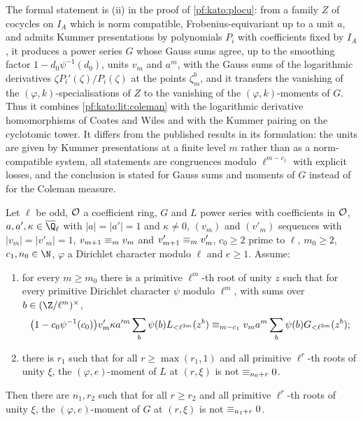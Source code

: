 \begin{remark}\label{pf:kato:rem:coleman}
The formal statement is (ii) in the proof of \cref{pf:kato:plocu}: from a family $Z$ of cocycles on $I_A$ which is norm compatible,
Frobenius-equivariant up to a unit $a$, and admits Kummer presentations by polynomials $P_i$ with coefficients fixed by $I_A$, it
produces a power series $G$ whose Gauss sums agree, up to the smoothing factor $1-d_0\psi^{-1}(d_0)$, units $v_m$ and $a^m$, with the
Gauss sums of the logarithmic derivatives $\zeta P_i'(\zeta)/P_i(\zeta)$ at the points $\zeta_m^b$, and it transfers the vanishing
of the $(\varphi,k)$-specialisations of $Z$ to the vanishing of the $(\varphi,k)$-moments of $G$. Thus it combines
\cref{pf:kato:lit:coleman} with the logarithmic derivative homomorphisms of Coates and Wiles \cite{CoatesWiles1977} and with the
Kummer pairing on the cyclotomic tower. It differs from the published results in its formulation: the units are given by Kummer
presentations at a finite level $m$ rather than as a norm-compatible system, all statements are congruences modulo $\ell^{m-c_1}$
with explicit losses, and the conclusion is stated for Gauss sums and moments of $G$ instead of for the Coleman measure.
\end{remark}

\begin{theorem}\label{pf:kato:transfer}
Let $\ell$ be odd, $\mathcal{O}$ a coefficient ring, $G$ and $L$ power series with coefficients in $\mathcal{O}$, $a,a',\kappa\in\katoQlb$ with
$|a|=|a'|=1$ and $\kappa\ne0$, $(v_m)$ and $(v'_m)$ sequences with $|v_m|=|v'_m|=1$, $v_{m+1}\equiv_{m}v_m$ and $v'_{m+1}\equiv_{m}v'_m$, $c_0\ge2$
prime to $\ell$, $m_0\ge2$, $c_1,n_0\in\N$, $\varphi$ a Dirichlet character modulo $\ell$ and $e\ge1$. Assume:
\begin{enumerate}[label=(\roman*)]
\item for every $m\ge m_0$ there is a primitive $\ell^m$-th root of unity $z$ such that for every primitive Dirichlet character $\psi$
  modulo $\ell^m$, with sums over $b\in(\Z/\ell^m)^\times$,
  \[
    \bigl(1-c_0\psi^{-1}(c_0)\bigr)v'_m\kappa a'^m\sum_b\psi(b)L_{<\ell^{3m}}(z^b)\equiv_{m-c_1}v_ma^m\sum_b\psi(b)G_{<\ell^{3m}}(z^b);
  \]
\item there is $r_1$ such that for all $r\ge\max(r_1,1)$ and all primitive $\ell^r$-th roots of unity $\xi$, the $(\varphi,e)$-moment of $L$
  at $(r,\xi)$ is not $\equiv_{n_0+r}0$.
\end{enumerate}
Then there are $n_1,r_2$ such that for all $r\ge r_2$ and all primitive $\ell^r$-th roots of unity $\xi$, the $(\varphi,e)$-moment of $G$ at
$(r,\xi)$ is not $\equiv_{n_1+r}0$.
\end{theorem}

